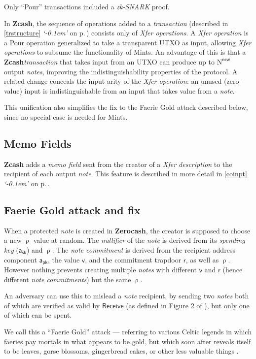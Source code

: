 \documentclass{article}
\newcommand{\crossref}[1]{\autoref{#1} \emph{`\nameref*{#1}\kern -0.1em'} on p.\,\pageref*{#1}}
\newcommand{\term}[1]{\textsl{#1}\xspace}
\newcommand{\titleterm}[1]{#1\xspace}
\newcommand{\termbf}[1]{\textbf{#1}\xspace}
\newcommand{\Zcash}{\termbf{Zcash}}
\newcommand{\Zerocash}{\termbf{Zerocash}}
\newcommand{\coin}{\term{note}}
\newcommand{\coins}{\term{notes}}
\newcommand{\coinCommitment}{\term{note commitment}}
\newcommand{\coinCommitments}{\term{note commitments}}
\newcommand{\pourDescription}{\term{Xfer description}}
\newcommand{\pourTransfer}{\term{Xfer operation}}
\newcommand{\pourTransfers}{\term{Xfer operations}}
\newcommand{\transaction}{\term{transaction}}
\newcommand{\serialNumber}{\term{nullifier}}
\newcommand{\spendingKey}{\term{spending key}}
\newcommand{\zkSNARK}{\term{zk-SNARK}}
\newcommand{\memo}{\term{memo field}}
\newcommand{\Memos}{\titleterm{Memo Fields}}
\newcommand{\AuthPublic}{\mathsf{a_{pk}}}
\newcommand{\AuthPrivate}{\mathsf{a_{sk}}}
\newcommand{\Value}{\mathsf{v}}
\newcommand{\CoinCommitRand}{\mathsf{r}}
\newcommand{\CoinAddressRand}{\mathsf{\uprho}}
\newcommand{\NNew}{\mathrm{N}^\mathsf{new}}
\newcommand{\Receive}{\mathsf{Receive}}
\begin{document}
Only ``Pour'' transactions included a \zkSNARK proof.

In \Zcash, the sequence of operations added to a \transaction
(described in \crossref{trstructure}) consists only of \pourTransfers.
A \pourTransfer is a Pour operation generalized to take a transparent
UTXO as input, allowing \pourTransfers to subsume the functionality of
Mints. An advantage of this is that a \Zcash \transaction that takes
input from an UTXO can produce up to $\NNew$ output \coins, improving
the indistinguishability properties of the protocol. A related change
conceals the input arity of the \pourTransfer: an unused (zero-value)
input is indistinguishable from an input that takes value from a \coin.

This unification also simplifies the fix to the Faerie Gold attack
described below, since no special case is needed for Mints.


\subsection{\Memos}

\Zcash adds a \memo sent from the creator of a \pourDescription to
the recipient of each output \coin. This feature is described in
more detail in \crossref{coinpt}.


\subsection{Faerie Gold attack and fix}

When a protected \coin is created in \Zerocash, the creator is
supposed to choose a new $\CoinAddressRand$ value at random.
The \serialNumber of the \coin is derived from its \spendingKey
($\AuthPrivate$) and $\CoinAddressRand$. The \coinCommitment
is derived from the recipient address component $\AuthPublic$,
the value $\Value$, and the commitment trapdoor $\CoinCommitRand$,
as well as $\CoinAddressRand$. However nothing prevents creating
multiple \coins with different $\Value$ and $\CoinCommitRand$
(hence different \coinCommitments) but the same $\CoinAddressRand$.

An adversary can use this to mislead a \coin recipient, by sending
two \coins both of which are verified as valid by $\Receive$ (as
defined in Figure 2 of \cite{ZerocashOakland}), but only one of
which can be spent.

We call this a ``Faerie Gold'' attack --- referring to various Celtic
legends in which faeries pay mortals in what appears to be gold,
but which soon after reveals itself to be leaves, gorse blossoms,
gingerbread cakes, or other less valuable things \cite{LG2004}.
\end{document}
